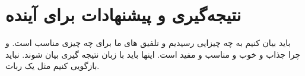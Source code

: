 \chapter{نتیجه‌گیری و پیشنهادات برای آینده}

باید بیان کنیم به چه چیزایی رسیدیم و تلفیق های ما برای چه چیزی مناسب است. و چرا جذاب و خوب و مناسب و مفید است. 
اینها باید با زبان نتیجه گیری بیان شوند. 
نباید بازگویی کنیم مثل یک ربات.
